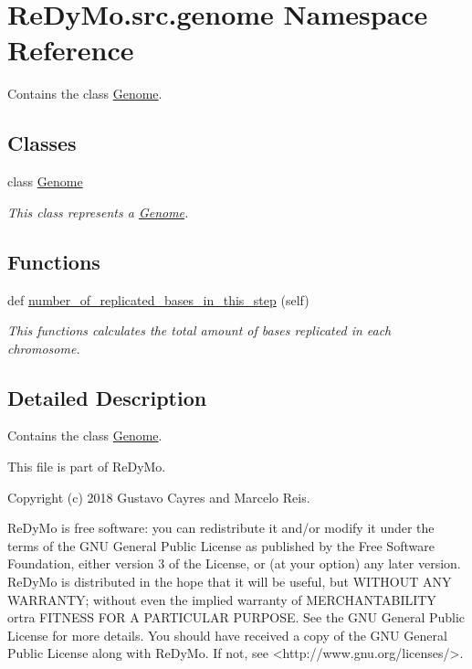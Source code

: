 \hypertarget{namespaceReDyMo_1_1src_1_1genome}{}\section{Re\+Dy\+Mo.\+src.\+genome Namespace Reference}
\label{namespaceReDyMo_1_1src_1_1genome}


Contains the class \mbox{\hyperlink{classReDyMo_1_1src_1_1genome_1_1Genome}{Genome}}.  


\subsection*{Classes}
\begin{DoxyCompactItemize}
\item 
class \mbox{\hyperlink{classReDyMo_1_1src_1_1genome_1_1Genome}{Genome}}
\begin{DoxyCompactList}\small\item\em This class represents a \mbox{\hyperlink{classReDyMo_1_1src_1_1genome_1_1Genome}{Genome}}. \end{DoxyCompactList}\end{DoxyCompactItemize}
\subsection*{Functions}
\begin{DoxyCompactItemize}
\item 
def \mbox{\hyperlink{namespaceReDyMo_1_1src_1_1genome_add11ea37fbc0e256164c4107d758b43b}{number\+\_\+of\+\_\+replicated\+\_\+bases\+\_\+in\+\_\+this\+\_\+step}} (self)
\begin{DoxyCompactList}\small\item\em This functions calculates the total amount of bases replicated in each chromosome. \end{DoxyCompactList}\end{DoxyCompactItemize}


\subsection{Detailed Description}
Contains the class \mbox{\hyperlink{classReDyMo_1_1src_1_1genome_1_1Genome}{Genome}}. 

\begin{DoxyVerb}This file is part of ReDyMo.

Copyright (c) 2018  Gustavo Cayres and Marcelo Reis.

ReDyMo is free software: you can redistribute it and/or modify it
under the terms of the GNU General Public License as published by the
Free Software Foundation, either version 3 of the License, or (at your
option) any later version.
ReDyMo is distributed in the hope that it will be useful, but WITHOUT
ANY WARRANTY; without even the implied warranty of MERCHANTABILITY ortra
FITNESS FOR A PARTICULAR PURPOSE. See the GNU General Public License
for more details.
You should have received a copy of the GNU General Public License along
with ReDyMo. If not, see <http://www.gnu.org/licenses/>.
\end{DoxyVerb}


